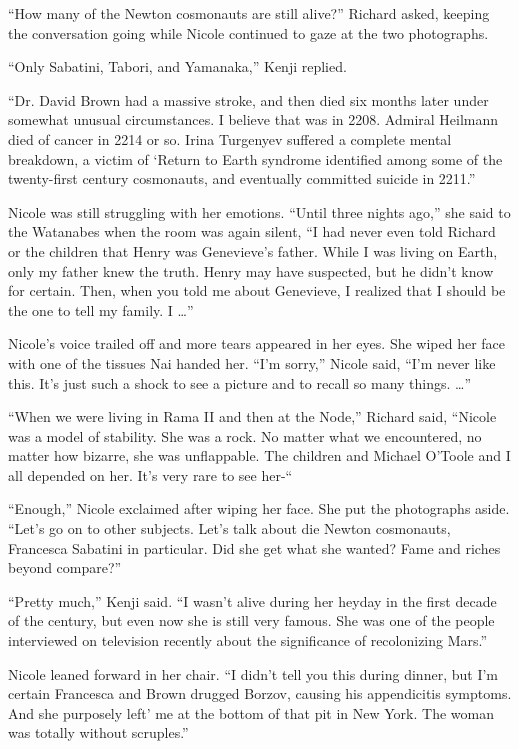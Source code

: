 \documentclass[]{article}
\begin{document}
{“How many of the Newton cosmonauts are still alive?” Richard asked, keeping the conversation going while Nicole continued to gaze at the two photographs.

“Only Sabatini, Tabori, and Yamanaka,” Kenji replied.

“Dr. David Brown had a massive stroke, and then died six months later under somewhat unusual circumstances. I believe that was in 2208. Admiral Heilmann died of cancer in 2214 or so. Irina Turgenyev suffered a complete mental breakdown, a victim of ‘Return to Earth syndrome identified among some of the twenty-first century cosmonauts, and eventually committed suicide in 2211.”

Nicole was still struggling with her emotions. “Until three nights ago,” she said to the Watanabes when the room was again silent, “I had never even told Richard or the children that Henry was Genevieve’s father. While I was living on Earth, only my father knew the truth. Henry may have suspected, but he didn’t know for certain. Then, when you told me about Genevieve, I realized that I should be the one to tell my family. I …”

Nicole’s voice trailed off and more tears appeared in her eyes. She wiped her face with one of the tissues Nai handed her. “I’m sorry,” Nicole said, “I’m never like this. It’s just such a shock to see a picture and to recall so many things. …”

“When we were living in Rama II and then at the Node,” Richard said, “Nicole was a model of stability. She was a rock. No matter what we encountered, no matter how bizarre, she was unflappable. The children and Michael O’Toole and I all depended on her. It’s very rare to see her-“

“Enough,” Nicole exclaimed after wiping her face. She put the photographs aside. “Let’s go on to other subjects. Let’s talk about die Newton cosmonauts, Francesca Sabatini in particular. Did she get what she wanted? Fame and riches beyond compare?”

“Pretty much,” Kenji said. “I wasn’t alive during her heyday in the first decade of the century, but even now she is still very famous. She was one of the people interviewed on television recently about the significance of recolonizing Mars.”

Nicole leaned forward in her chair. “I didn’t tell you this during dinner, but I’m certain Francesca and Brown drugged Borzov, causing his appendicitis symptoms. And she purposely left’ me at the bottom of that pit in New York. The woman was totally without scruples.”

}
\end{document}

